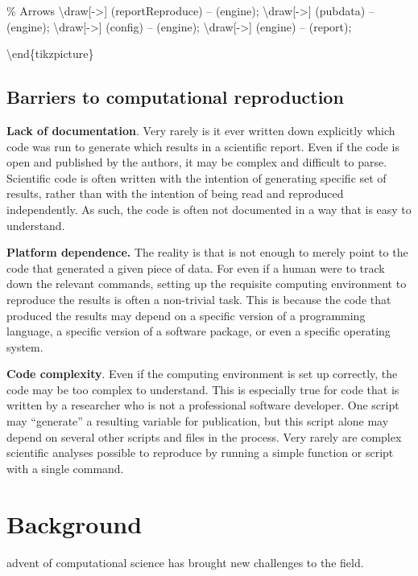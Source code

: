 \% Arrows
\textbackslash{}draw[->] (reportReproduce) -- (engine);
\textbackslash{}draw[->] (pubdata) -- (engine);
\textbackslash{}draw[->] (config) -- (engine);
\textbackslash{}draw[->] (engine) -- (report);

\textbackslash{}end\{tikzpicture\}

\hypertarget{barriers-to-computational-reproduction}{%
\subsection{Barriers to computational reproduction}\label{barriers-to-computational-reproduction}}

\textbf{Lack of documentation}. Very rarely is it ever written down explicitly which code was run to generate which results in a scientific report. Even if the code is open and published by the authors, it may be complex and difficult to parse. Scientific code is often written with the intention of generating specific set of results, rather than with the intention of being read and reproduced independently. As such, the code is often not documented in a way that is easy to understand.

\textbf{Platform dependence.} The reality is that is not enough to merely point to the code that generated a given piece of data. For even if a human were to track down the relevant commands, setting up the requisite computing environment to reproduce the results is often a non-trivial task. This is because the code that produced the results may depend on a specific version of a programming language, a specific version of a software package, or even a specific operating system.

\textbf{Code complexity}. Even if the computing environment is set up correctly, the code may be too complex to understand. This is especially true for code that is written by a researcher who is not a professional software developer. One script may ``generate'' a resulting variable for publication, but this script alone may depend on several other scripts and files in the process. Very rarely are complex scientific analyses possible to reproduce by running a simple function or script with a single command.

\hypertarget{background}{%
\section{Background}\label{background}}

advent of computational science has brought new challenges to the field.

